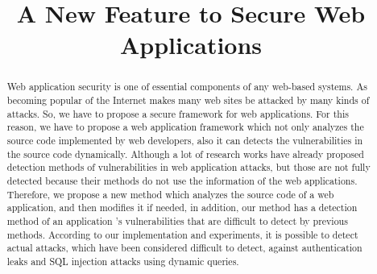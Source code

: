 \documentclass[conference]{IEEEtran}
\begin{document}
\title{A New Feature to Secure Web Applications}

\author{
\and
{}
\and
{}
}

\maketitle

\begin{abstract}
Web application security is one of essential components of any web-based systems.
As becoming popular of the Internet makes many web sites be attacked by many kinds of  attacks.
So, we have to propose a secure framework for web applications.
For this reason, we have to propose a web application framework which not only analyzes the source code implemented by web developers, also it can detects the vulnerabilities in the source code dynamically.
Although a lot of research works have already proposed detection methods of vulnerabilities in web application attacks, but those are not fully detected because their methods do not use the information of the web applications.
Therefore, we propose a new method which analyzes the source code of a web application, and then modifies it if needed, in addition, our method has a detection method of an application ’s vulnerabilities that are difficult to detect by previous methods.
According to our implementation and experiments, it is possible to detect actual attacks, which have been considered difficult to detect, against authentication leaks and SQL injection attacks using dynamic queries.
\end{abstract}
\end{document}
